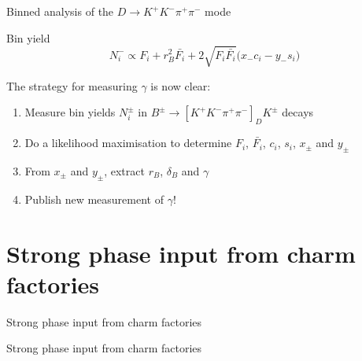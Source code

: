 \documentclass{beamer}
\begin{document}
\begin{frame}{Binned analysis of the $D\to K^+K^-\pi^+\pi^-$ mode}
  \begin{center}
    \begin{minipage}{8cm}
      \begin{block}{\centering Bin yield}
        \vspace{-0.5cm}
        \begin{equation*}
          N_i^-\propto F_i + r_B^2\bar{F_i} + 2\sqrt{F_i\bar{F_i}}\big(x_-c_i - y_-s_i\big)
        \end{equation*}
      \end{block}
    \end{minipage}
  \end{center}
  \vspace{0.3cm}
  \begin{center}
    \Large The strategy for measuring $\gamma$ is now clear:
  \end{center}
  \begin{enumerate}
    \setlength\itemsep{1.0em}
    \item{Measure bin yields $N_i^\pm$ in $B^\pm\to[K^+K^-\pi^+\pi^-]_DK^\pm$ decays}
    \item{Do a likelihood maximisation to determine $F_i$, $\bar{F_i}$, $c_i$, $s_i$, $x_\pm$ and $y_\pm$}
    \item{From $x_\pm$ and $y_\pm$, extract $r_B$, $\delta_B$ and $\gamma$}
    \item{Publish new measurement of $\gamma$!}
  \end{enumerate}
\end{frame}

\section{Strong phase input from charm factories}
\begin{frame}{Strong phase input from charm factories}
  \begin{center}
    {\huge Strong phase input from charm factories}
  \end{center}
\end{frame}
\end{document}
